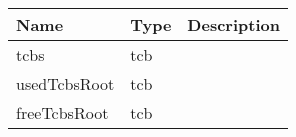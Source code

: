 



\begin{par}

\end{par}


\begin{tabular}[ht]{|l|l|p{8cm}|}
\hline
\textbf{Name} & \textbf{Type} & \textbf{Description}\\
\hline
tcbs & tcb & \\
\hline
usedTcbsRoot & tcb & \\
\hline
freeTcbsRoot & tcb & \\
\hline
\end{tabular}

